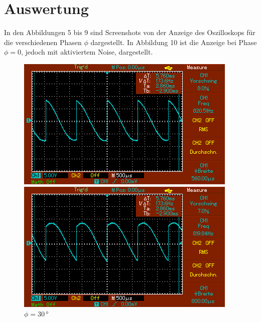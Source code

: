 \section{Auswertung}
\label{sec:Auswertung}

\begin{table}
    \centering
    
\end{table}
In den Abbildungen 5 bis 9 sind Screenshots von der Anzeige des Oszilloskops für die verschiedenen Phasen $\phi$ dargestellt. In Abbildung 10 ist
die Anzeige bei Phase $\phi = 0$, jedoch mit aktiviertem Noise, dargestellt. 
\begin{figure}
    \begin{minipage}[b]{.45\linewidth} %
       \includegraphics[width=\linewidth]{bilder/MAP003.png}
       \caption{$\phi = 0\,\unit{°}$}
    \end{minipage}
    \hspace{0.1\linewidth}%
    \begin{minipage}[b]{.45\linewidth} %
       \includegraphics[width=\linewidth]{bilder/MAP004.png}
       \caption{$\phi = 30\,\unit{°}$}
    \end{minipage}
\end{figure}

